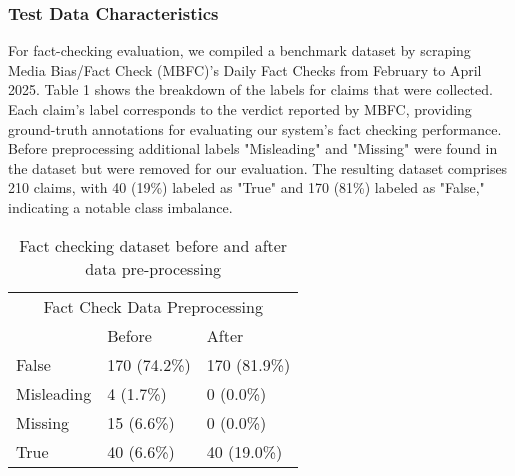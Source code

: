 \documentclass[11pt]{article}
\begin{document}
\subsubsection{Test Data Characteristics}
For fact-checking evaluation, we compiled a benchmark dataset by scraping Media Bias/Fact Check (MBFC)’s Daily Fact Checks from February to April 2025. Table 1 shows the breakdown of the labels for claims that were collected. Each claim’s label corresponds to the verdict reported by MBFC, providing ground-truth annotations for evaluating our system’s fact checking performance. Before preprocessing additional labels "Misleading" and "Missing" were found in the dataset but were removed for our evaluation. The resulting dataset comprises 210 claims, with 40 (19\%) labeled as "True" and 170 (81\%) labeled as "False," indicating a notable class imbalance. 
\begin{table}[H]
\begin{center}
\begin{tabular}{llll}
\hline
\multicolumn{4}{c}{Fact Check Data Preprocessing}                     \\
                & \multicolumn{2}{l}{Before}       & After            \\ \hline
False           & \multicolumn{2}{l}{170 (74.2\%)} & 170 (81.9\%)     \\
Misleading& \multicolumn{2}{l}{4 (1.7\%)}    & 0 (0.0\%)        \\
Missing         & \multicolumn{2}{l}{15 (6.6\%)}   & 0 (0.0\%)        \\
True& \multicolumn{2}{l}{40 (6.6\%)}   & 40 (19.0\%)      \\ \hline
\end{tabular}
\caption{Fact checking dataset before and after data pre-processing}
\end{center}
\label{tab:my_table}
\end{table}
\end{document}
